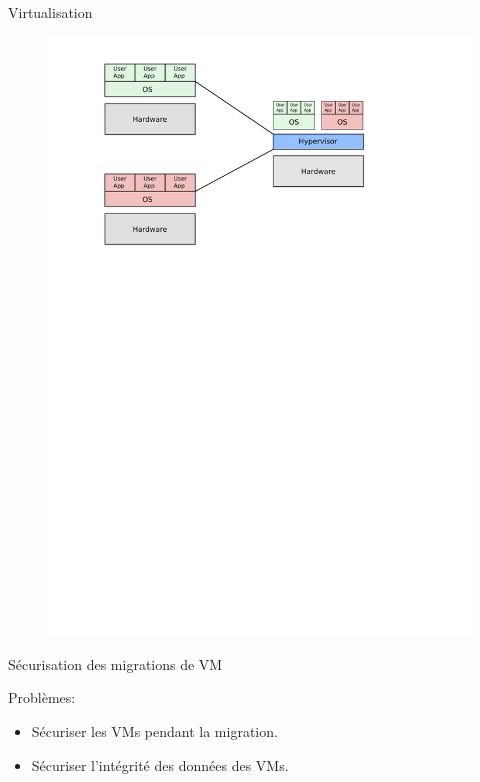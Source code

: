 \documentclass{libs/XJTLU_format}
\begin{document}
\begin{frame}{Virtualisation}
{\begin{figure}
        \includegraphics[scale=0.5]{images/virt2.png}
        \end{figure}
    }
\end{frame}
\begin{frame}{Sécurisation des migrations de VM}
     {
        Problèmes:
        \begin{itemize}
            \item Sécuriser les VMs pendant la migration.
            \item Sécuriser l'intégrité des données des VMs.
        \end{itemize}
    }
    
\end{frame}
\end{document}
